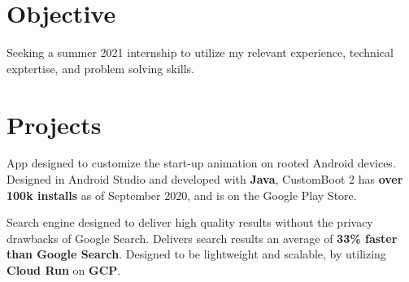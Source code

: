 \documentclass[letterpaper]{deedy-resume} %
\begin{document}
\hfill
%
%
\begin{minipage}[t]{0.66\textwidth} %



\section{Objective}

Seeking a summer 2021 internship to utilize my relevant experience, technical exptertise, and problem solving skills.

\sectionspace %







\section{Projects}


App designed to customize the start-up animation on rooted Android devices. Designed in Android Studio and developed with \textbf{Java}, CustomBoot 2 has \textbf{over 100k installs} as of September 2020, and is on the Google Play Store.

\sectionspace %

Search engine designed to deliver high quality results without the privacy drawbacks of Google Search. Delivers search results an average of \textbf{33\% faster than Google Search}. Designed to be lightweight and scalable, by utilizing \textbf{Cloud Run} on \textbf{GCP}.


\end{minipage}
\end{document}
